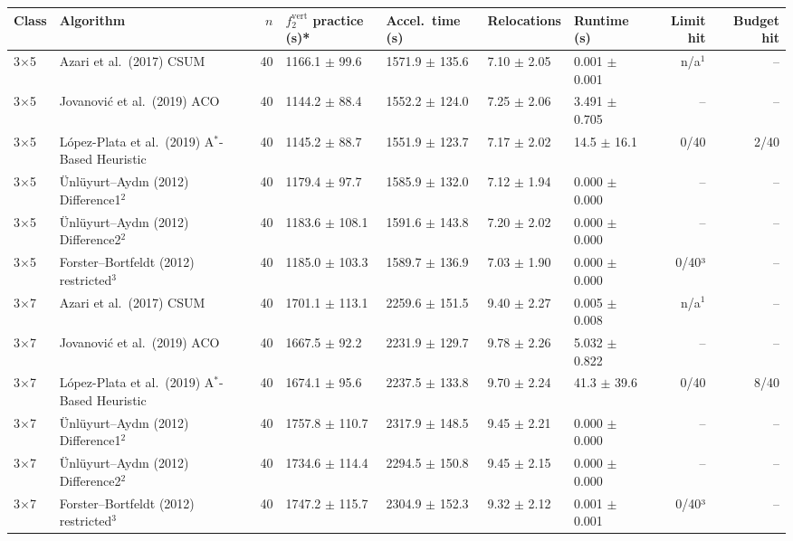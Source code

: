 \begin{table}[htbp]
\centering
\small
\begin{tabular}{llrllllrr}
\toprule
Class & Algorithm & $n$ & $f_2^{\mathrm{vert}}$ practice (s)* & Accel.\ time (s) & Relocations & Runtime (s) & Limit hit & Budget hit \\
\midrule
3$\times$5 & Azari et al.\ (2017) CSUM & 40 & 1166.1 $\pm$ 99.6 & 1571.9 $\pm$ 135.6 & 7.10 $\pm$ 2.05 & 0.001 $\pm$ 0.001 & n/a$^{1}$ & -- \\
3$\times$5 & Jovanovi\'{c} et al.\ (2019) ACO & 40 & 1144.2 $\pm$ 88.4 & 1552.2 $\pm$ 124.0 & 7.25 $\pm$ 2.06 & 3.491 $\pm$ 0.705 & -- & -- \\
3$\times$5 & L\'{o}pez-Plata et al.\ (2019) A$^\ast$-Based Heuristic & 40 & 1145.2 $\pm$ 88.7 & 1551.9 $\pm$ 123.7 & 7.17 $\pm$ 2.02 & 14.5 $\pm$ 16.1 & 0/40 & 2/40 \\
3$\times$5 & \"{U}nl\"{u}yurt--Ayd\i{}n (2012) Difference1$^{2}$ & 40 & 1179.4 $\pm$ 97.7 & 1585.9 $\pm$ 132.0 & 7.12 $\pm$ 1.94 & 0.000 $\pm$ 0.000 & -- & -- \\
3$\times$5 & \"{U}nl\"{u}yurt--Ayd\i{}n (2012) Difference2$^{2}$ & 40 & 1183.6 $\pm$ 108.1 & 1591.6 $\pm$ 143.8 & 7.20 $\pm$ 2.02 & 0.000 $\pm$ 0.000 & -- & -- \\
3$\times$5 & Forster--Bortfeldt (2012) restricted$^{3}$ & 40 & 1185.0 $\pm$ 103.3 & 1589.7 $\pm$ 136.9 & 7.03 $\pm$ 1.90 & 0.000 $\pm$ 0.000 & 0/40³ & -- \\
\midrule
3$\times$7 & Azari et al.\ (2017) CSUM & 40 & 1701.1 $\pm$ 113.1 & 2259.6 $\pm$ 151.5 & 9.40 $\pm$ 2.27 & 0.005 $\pm$ 0.008 & n/a$^{1}$ & -- \\
3$\times$7 & Jovanovi\'{c} et al.\ (2019) ACO & 40 & 1667.5 $\pm$ 92.2 & 2231.9 $\pm$ 129.7 & 9.78 $\pm$ 2.26 & 5.032 $\pm$ 0.822 & -- & -- \\
3$\times$7 & L\'{o}pez-Plata et al.\ (2019) A$^\ast$-Based Heuristic & 40 & 1674.1 $\pm$ 95.6 & 2237.5 $\pm$ 133.8 & 9.70 $\pm$ 2.24 & 41.3 $\pm$ 39.6 & 0/40 & 8/40 \\
3$\times$7 & \"{U}nl\"{u}yurt--Ayd\i{}n (2012) Difference1$^{2}$ & 40 & 1757.8 $\pm$ 110.7 & 2317.9 $\pm$ 148.5 & 9.45 $\pm$ 2.21 & 0.000 $\pm$ 0.000 & -- & -- \\
3$\times$7 & \"{U}nl\"{u}yurt--Ayd\i{}n (2012) Difference2$^{2}$ & 40 & 1734.6 $\pm$ 114.4 & 2294.5 $\pm$ 150.8 & 9.45 $\pm$ 2.15 & 0.000 $\pm$ 0.000 & -- & -- \\
3$\times$7 & Forster--Bortfeldt (2012) restricted$^{3}$ & 40 & 1747.2 $\pm$ 115.7 & 2304.9 $\pm$ 152.3 & 9.32 $\pm$ 2.12 & 0.001 $\pm$ 0.001 & 0/40³ & -- \\

\end{tabular}
\end{table}
